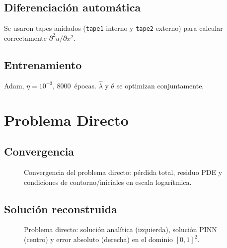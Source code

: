 \documentclass[12pt,a4paper]{article}
\newcommand{\lhat}{\hat{\lambda}}
\begin{document}
\subsection{Diferenciación automática}
Se usaron tapes anidados (\texttt{tape1} interno y \texttt{tape2} externo) para calcular
correctamente $\partial^2\tilde{u}/\partial x^2$.

\subsection{Entrenamiento}
Adam, $\eta=10^{-3}$, 8000~épocas. $\lhat$ y $\theta$ se optimizan conjuntamente.

\section{Problema Directo}

\subsection{Convergencia}

\begin{figure}[H]
  \centering
  \caption{Convergencia del problema directo: pérdida total, residuo PDE y
           condiciones de contorno/iniciales en escala logarítmica.}
  \label{fig:conv_directo}
\end{figure}

\subsection{Solución reconstruida}

\begin{figure}[H]
  \centering
  \caption{Problema directo: solución analítica (izquierda), solución PINN (centro) y
           error absoluto (derecha) en el dominio $[0,1]^2$.}
  \label{fig:sol_directo}
\end{figure}
\end{document}

